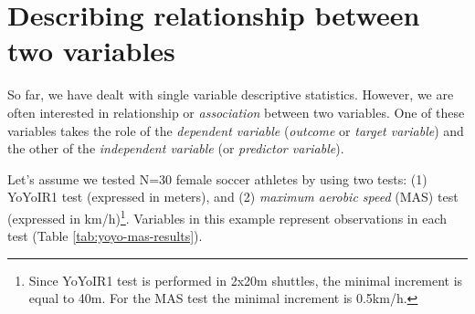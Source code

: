 \documentclass[
]{book}
\begin{document}
\hypertarget{describing-relationship-between-two-variables}{%
\section{Describing relationship between two variables}\label{describing-relationship-between-two-variables}}

So far, we have dealt with single variable descriptive statistics. However, we are often interested in relationship or \emph{association} between two variables. One of these variables takes the role of the \emph{dependent variable} (\emph{outcome} or \emph{target variable}) and the other of the \emph{independent variable} (or \emph{predictor variable}).

Let's assume we tested N=30 female soccer athletes by using two tests: (1) YoYoIR1 test (expressed in meters), and (2) \emph{maximum aerobic speed} (MAS) test (expressed in km/h)\footnote{Since YoYoIR1 test is performed in 2x20m shuttles, the minimal increment is equal to 40m. For the MAS test the minimal increment is 0.5km/h.}. Variables in this example represent observations in each test (Table \ref{tab:yoyo-mas-results}).
\end{document}
